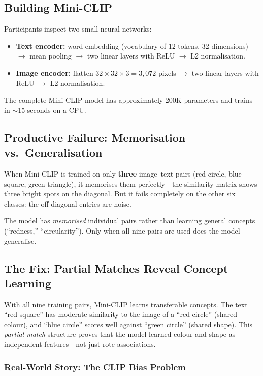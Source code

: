 \documentclass[11pt,a4paper]{article}
\begin{document}
\subsection{Building Mini-CLIP}

Participants inspect two small neural networks:

\begin{itemize}[nosep]
  \item \textbf{Text encoder:} word embedding (vocabulary of 12 tokens,
        32 dimensions) $\to$ mean pooling $\to$ two linear layers with
        ReLU $\to$ L2 normalisation.
  \item \textbf{Image encoder:} flatten $32 \times 32 \times 3 = 3{,}072$
        pixels $\to$ two linear layers with ReLU $\to$ L2 normalisation.
\end{itemize}

The complete Mini-CLIP model has approximately 200K parameters and trains
in $\sim$15 seconds on a CPU.

\subsection{Productive Failure: Memorisation vs.\ Generalisation}

When Mini-CLIP is trained on only \textbf{three} image--text pairs (red
circle, blue square, green triangle), it memorises them perfectly---the
similarity matrix shows three bright spots on the diagonal.  But it fails
completely on the other six classes: the off-diagonal entries are noise.

The model has \emph{memorised} individual pairs rather than learning
general concepts (``redness,'' ``circularity'').  Only when all nine pairs
are used does the model generalise.

\subsection{The Fix: Partial Matches Reveal Concept Learning}

With all nine training pairs, Mini-CLIP learns transferable concepts.
The text ``red square'' has moderate similarity to the image of a ``red
circle'' (shared colour), and ``blue circle'' scores well against ``green
circle'' (shared shape).  This \emph{partial-match} structure proves that
the model learned colour and shape as independent features---not just
rote associations.

\subsubsection*{Real-World Story: The CLIP Bias Problem}
\end{document}
